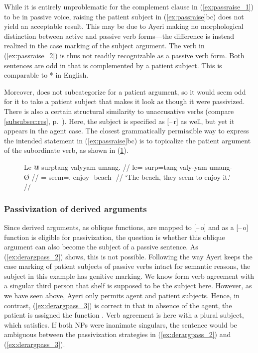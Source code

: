 While it is entirely unproblematic for the complement clause in
(\ref{ex:passraise_1}) to be in passive voice, raising the patient subject in
(\ref{ex:passraise}bc) does not yield an acceptable result. This may be due to
Ayeri making no morphological distinction between active and passive verb
forms---the difference is instead realized in the case marking of the subject
argument. The verb  in (\ref{ex:passraise_2}) is thus
not readily recognizable as a passive verb form. Both sentences are odd in that
 is complemented by a patient subject. This is
comparable to * in English.

Moreover,  does not subcategorize for a patient argument,
so it would seem odd for it to take a patient subject that makes it look as
though it were passivized. There is also a certain structural similarity to
unaccusative verbs (compare \autoref{subsubsec:res},
p.~\pageref{subsubsec:res}). Here, the subject is specified as [–\,r] as well,
but yet it appears in the agent case. The closest grammatically permissible way
to express the intended statement in (\ref{ex:passraise}bc) is to topicalize
the patient argument of the subordinate verb, as shown in (\ref{ex:raisept}).

\begin{figure}[h]
\ex\label{ex:raisept}\begingl
	\gla Le @ surptang valyyam umang. //
	\glb le= surp=tang valy-yam umang-Ø //
	\glc \PatTI{}= seem=\TplM.\Aarg{} enjoy-\Ptcp{} beach-\Top{} //
	\glft `The beach, they seem to enjoy it.' //
\endgl\xe
\end{figure}

\subsubsection{Passivization of derived arguments}

Since derived arguments, as oblique functions, are mapped to [–\,o] and
\Subj{} as a [–\,o] function is eligible for passivization, the question is
whether this oblique argument can also become the subject of a passive
sentence. As (\ref{ex:derargpass_2}) shows, this is not possible. Following the
way Ayeri keeps the case marking of patient subjects of passive verbs intact
for semantic reasons, the subject in this example has genitive marking. We know
form verb agreement with a singular third person that 
{shelf} is supposed to be the subject here. However, as we have seen above,
Ayeri only permits agent and patient subjects. Hence, in contrast,
(\ref{ex:derargpass_3}) is correct in that in absence of the agent, the patient
is assigned the \Subj{} function \citep[334]{bresnan2016}. Verb agreement is
here with a plural subject, which 
satisfies. If both NPs were inanimate singulars, the sentence would be
ambiguous between the passivization strategies in (\ref{ex:derargpass_2}) and
(\ref{ex:derargpass_3}).

